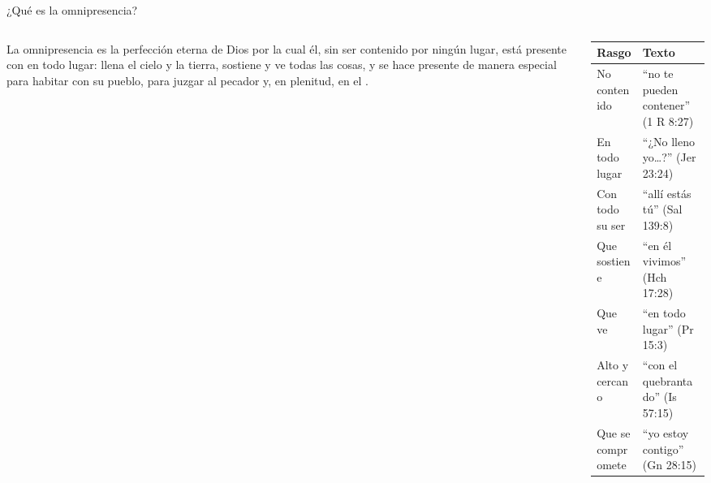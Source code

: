\begin{frame}{¿Qué es la omnipresencia?}
\begin{columns}[c,onlytextwidth]
\begin{column}{0.48\textwidth}
\begin{tcolorbox}[colback=papiro,colframe=azul,boxrule=1pt,arc=3pt,title={\small Definición},colbacktitle=azul,coltitle=papiro]
\small La omnipresencia es la perfección eterna de Dios por la cual él, sin ser contenido por ningún lugar, está presente con  en todo lugar: llena el cielo y la tierra, sostiene y ve todas las cosas, y se hace presente de manera especial para habitar con su pueblo, para juzgar al pecador y, en plenitud, en el .
\end{tcolorbox}
\end{column}
\begin{column}{0.50\textwidth}
\scriptsize\renewcommand{\arraystretch}{1.12}
\begin{tabular}{@{}>{\RaggedRight\arraybackslash}p{1.9cm}>{\RaggedRight\arraybackslash}p{4.3cm}@{}}
\toprule
\textbf{Rasgo} & \textbf{Texto} \\ \midrule
No contenido & ``no te pueden contener'' (1 R 8:27) \\
En todo lugar & ``¿No lleno yo\ldots?'' (Jer 23:24) \\
Con todo su ser & ``allí estás tú'' (Sal 139:8) \\
Que sostiene & ``en él vivimos'' (Hch 17:28) \\
Que ve & ``en todo lugar'' (Pr 15:3) \\
Alto y cercano & ``con el quebrantado'' (Is 57:15) \\
Que se compromete & ``yo estoy contigo'' (Gn 28:15) \\
\bottomrule
\end{tabular}
\end{column}
\end{columns}
\end{frame}

